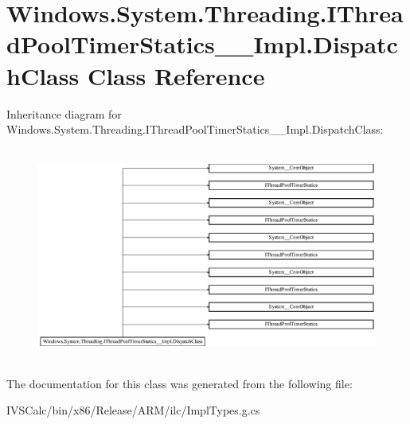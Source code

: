 \hypertarget{class_windows_1_1_system_1_1_threading_1_1_i_thread_pool_timer_statics_____impl_1_1_dispatch_class}{}\section{Windows.\+System.\+Threading.\+I\+Thread\+Pool\+Timer\+Statics\+\_\+\+\_\+\+Impl.\+Dispatch\+Class Class Reference}
\label{class_windows_1_1_system_1_1_threading_1_1_i_thread_pool_timer_statics_____impl_1_1_dispatch_class}
Inheritance diagram for Windows.\+System.\+Threading.\+I\+Thread\+Pool\+Timer\+Statics\+\_\+\+\_\+\+Impl.\+Dispatch\+Class\+:\begin{figure}[H]
\begin{center}
\leavevmode
\includegraphics[height=7.080460cm]{class_windows_1_1_system_1_1_threading_1_1_i_thread_pool_timer_statics_____impl_1_1_dispatch_class}
\end{center}
\end{figure}


The documentation for this class was generated from the following file\+:\begin{DoxyCompactItemize}
\item 
I\+V\+S\+Calc/bin/x86/\+Release/\+A\+R\+M/ilc/Impl\+Types.\+g.\+cs\end{DoxyCompactItemize}
